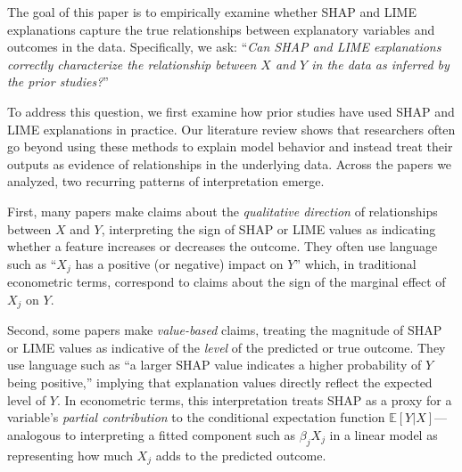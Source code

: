 \documentclass[mnsc,blindrev]{informs3}
\begin{document}
The goal of this paper is to empirically examine whether SHAP and LIME explanations capture the true relationships between explanatory variables and outcomes in the data. Specifically, we ask:
``\emph{Can SHAP and LIME explanations correctly characterize the relationship between $X$ and $Y$ in the data as inferred by the prior studies?}'' 

To address this question, we first examine how prior studies have used SHAP and LIME explanations in practice.
Our literature review shows that researchers often go beyond using these methods to explain model behavior and instead treat their outputs as evidence of relationships in the underlying data.
Across the papers we analyzed, two recurring patterns of interpretation emerge.

First, many papers make claims about the \textit{qualitative direction} of relationships between 
$X$ and $Y$, interpreting the sign of SHAP or LIME values as indicating whether a feature increases or decreases the outcome.
They often use language such as “$X_j$ has a positive (or negative) impact on $Y$” which, in traditional econometric terms, correspond to claims about the sign of the marginal effect of 
$X_j$ on $Y$.

Second, some papers make \textit{value-based} claims, treating the magnitude of SHAP or LIME values as indicative of the \textit{level} of the predicted or true outcome. 
They use language such as ``a larger SHAP value indicates a higher probability of $Y$ being positive,'' implying that explanation values directly reflect the expected level of $Y$. 
In econometric terms, this interpretation treats SHAP as a proxy for a variable’s \textit{partial contribution} to the conditional expectation function $\mathbb{E}[Y|X]$—analogous to interpreting a fitted component such as $\beta_j X_j$ in a linear model as representing how much $X_j$ adds to the predicted outcome.
\end{document}

